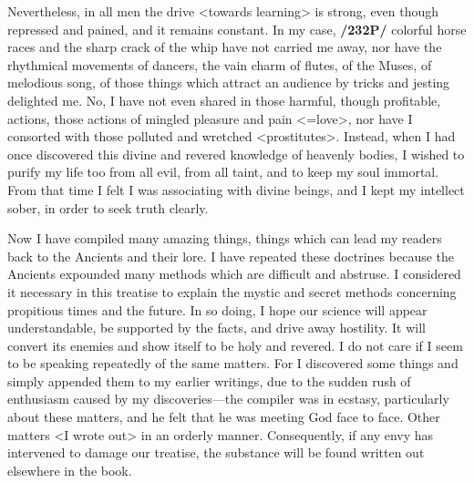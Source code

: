 Nevertheless, in all men the drive <towards learning> is strong, even though repressed and pained, and it remains constant. In my case, \textbf{/232P/} colorful horse races and the sharp crack of the whip have not carried me away, nor have the rhythmical movements of dancers, the vain charm of flutes, of the Muses, of melodious song, of those things which attract an audience by tricks and jesting delighted me. No, I have not even shared in those harmful, though profitable, actions, those actions of mingled pleasure and pain <=love>, nor have I consorted with those polluted and wretched <prostitutes>. Instead, when I had once discovered this divine and revered knowledge of heavenly bodies, I wished to purify my life too from all evil, from all taint, and to keep my soul immortal. From that time I felt I was associating with divine beings, and I kept my intellect sober, in order to seek truth clearly.

Now I have compiled many amazing things, things which can lead my readers back to the Ancients and their lore. I have repeated these doctrines because the Ancients expounded many methods which are
difficult and abstruse. I considered it necessary in this treatise to explain the mystic and secret methods concerning propitious times and the future. In so doing, I hope our science will appear understandable, be supported by the facts, and drive away hostility. It will convert its enemies and show itself to be holy and revered. I do not care if I seem to be speaking repeatedly of the same matters. For I discovered some
things and simply appended them to my earlier writings, due to the sudden rush of enthusiasm caused by my discoveries—the compiler was in ecstasy, particularly about these matters, and he felt that he was meeting God face to face. Other matters <I wrote out> in an orderly manner. Consequently, if any envy has intervened to damage our treatise, the substance will be found written out elsewhere in the book.

\newpage